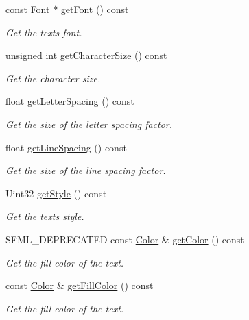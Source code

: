 \begin{DoxyCompactItemize}
const \mbox{\hyperlink{classsf_1_1_font}{Font}} $\ast$ \mbox{\hyperlink{classsf_1_1_text_a47cd96d7b2c37b2f820e4d6e1bb83f96}{get\+Font}} () const
\begin{DoxyCompactList}\small\item\em Get the text\textquotesingle{}s font. \end{DoxyCompactList}\item 
unsigned int \mbox{\hyperlink{classsf_1_1_text_a46d1d7f1d513bb8d434e985a93ea5224}{get\+Character\+Size}} () const
\begin{DoxyCompactList}\small\item\em Get the character size. \end{DoxyCompactList}\item 
float \mbox{\hyperlink{classsf_1_1_text_a028fc6e561bd9a0671254419b498b889}{get\+Letter\+Spacing}} () const
\begin{DoxyCompactList}\small\item\em Get the size of the letter spacing factor. \end{DoxyCompactList}\item 
float \mbox{\hyperlink{classsf_1_1_text_a670622e1c299dfd6518afe289c7cd248}{get\+Line\+Spacing}} () const
\begin{DoxyCompactList}\small\item\em Get the size of the line spacing factor. \end{DoxyCompactList}\item 
Uint32 \mbox{\hyperlink{classsf_1_1_text_a0da79b0c057f4bb51592465a205c35d7}{get\+Style}} () const
\begin{DoxyCompactList}\small\item\em Get the text\textquotesingle{}s style. \end{DoxyCompactList}\item 
S\+F\+M\+L\+\_\+\+D\+E\+P\+R\+E\+C\+A\+T\+ED const \mbox{\hyperlink{classsf_1_1_color}{Color}} \& \mbox{\hyperlink{classsf_1_1_text_a77ba664285efd72ab4ce85b9cbbeeb21}{get\+Color}} () const
\begin{DoxyCompactList}\small\item\em Get the fill color of the text. \end{DoxyCompactList}\item 
const \mbox{\hyperlink{classsf_1_1_color}{Color}} \& \mbox{\hyperlink{classsf_1_1_text_a6b4ba8c435b59e1e05f831e6230dc537}{get\+Fill\+Color}} () const
\begin{DoxyCompactList}\small\item\em Get the fill color of the text. \end{DoxyCompactList}\item 

\end{DoxyCompactItemize}
